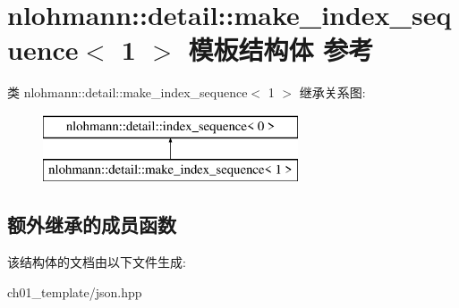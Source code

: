 \hypertarget{structnlohmann_1_1detail_1_1make__index__sequence_3_011_01_4}{}\section{nlohmann\+::detail\+::make\+\_\+index\+\_\+sequence$<$ 1 $>$ 模板结构体 参考}
\label{structnlohmann_1_1detail_1_1make__index__sequence_3_011_01_4}
类 nlohmann\+::detail\+::make\+\_\+index\+\_\+sequence$<$ 1 $>$ 继承关系图\+:\begin{figure}[H]
\begin{center}
\leavevmode
\includegraphics[height=2.000000cm]{structnlohmann_1_1detail_1_1make__index__sequence_3_011_01_4}
\end{center}
\end{figure}
\subsection*{额外继承的成员函数}


该结构体的文档由以下文件生成\+:\begin{DoxyCompactItemize}
\item 
ch01\+\_\+template/json.\+hpp\end{DoxyCompactItemize}
